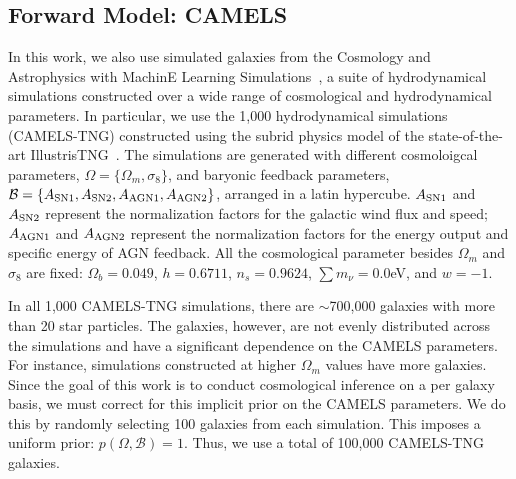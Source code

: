 \subsection{Forward Model: CAMELS} \label{sec:sims} 
In this work, we also use simulated galaxies from the Cosmology and
Astrophysics with MachinE Learning
Simulations~\citep[CAMELS;]{villaescusa-navarro2021, villaescusa-navarro2022a},
a suite of hydrodynamical simulations constructed over a wide
range of cosmological and hydrodynamical parameters.
In particular, we use the 1,000 hydrodynamical simulations (CAMELS-TNG)
constructed using the subrid physics model of the state-of-the-art
IllustrisTNG~\citep{nelson2019}. 
The simulations are generated with different cosmoloigcal parameters,
$\Omega = \{\Omega_m, \sigma_8\}$, and baryonic feedback parameters, 
$\mathcal{B} = \{A_{\rm SN1}, A_{\rm SN2}, A_{\rm AGN1}, A_{\rm AGN2}\}$,
arranged in a latin hypercube. 
$A_{\rm SN1}$ and $A_{\rm SN2}$ represent the normalization factors for the 
galactic wind flux and speed; 
$A_{\rm AGN1}$ and $A_{\rm AGN2}$ represent the normalization factors for the 
energy output and specific energy of AGN feedback.
All the cosmological parameter besides $\Omega_m$ and $\sigma_8$ are fixed:
$\Omega_b = 0.049$, $h = 0.6711$, $n_s = 0.9624$, $\sum m_\nu = 0.0$eV, and 
$w = -1$.

In all 1,000 CAMELS-TNG simulations, there are $\sim$700,000 galaxies with more
than 20 star particles. 
The galaxies, however, are not evenly distributed across the simulations and
have a significant dependence on the CAMELS parameters.  
For instance, simulations constructed at higher $\Omega_m$ values have more
galaxies.  
Since the goal of this work is to conduct cosmological inference on a per
galaxy basis, we must correct for this implicit prior on the CAMELS parameters.
We do this by randomly selecting 100 galaxies from each simulation. 
This imposes a uniform prior: $p(\Omega, \mathcal{B}) = 1$. 
Thus, we use a total of 100,000 CAMELS-TNG galaxies.  

